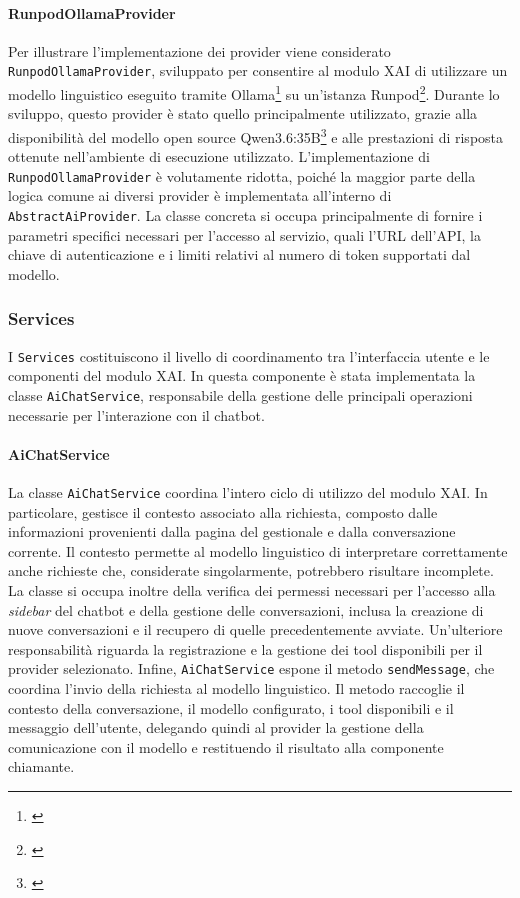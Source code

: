 \paragraph{RunpodOllamaProvider}
Per illustrare l'implementazione dei provider viene considerato \newline\texttt{RunpodOllamaProvider}, sviluppato per consentire al modulo XAI di utilizzare un modello linguistico 
eseguito tramite Ollama\footnote{\cite{site:ollama}} su un'istanza Runpod\footnote{\cite{site:runpod}}. Durante lo sviluppo, questo provider è stato quello principalmente utilizzato, grazie alla disponibilità del modello open source 
Qwen3.6:35B\footnote{\cite{site:qwen}} e alle prestazioni di risposta ottenute nell'ambiente di esecuzione utilizzato.
\newline
L'implementazione di \texttt{RunpodOllamaProvider} è volutamente ridotta, poiché la maggior parte della logica comune ai diversi provider è implementata all'interno di 
\texttt{AbstractAiProvider}. La classe concreta si occupa principalmente di fornire i parametri specifici necessari per l'accesso al servizio, quali l'URL dell'API, la chiave 
di autenticazione e i limiti relativi al numero di token supportati dal modello.

\subsubsection{Services}
I \texttt{Services} costituiscono il livello di coordinamento tra l'interfaccia utente e le componenti del modulo XAI. In questa componente è stata implementata la classe 
\texttt{AiChatService}, responsabile della gestione delle principali operazioni necessarie per l'interazione con il chatbot.

\paragraph{AiChatService}
La classe \texttt{AiChatService} coordina l'intero ciclo di utilizzo del modulo XAI. In particolare, gestisce il contesto associato alla richiesta, composto dalle informazioni 
provenienti dalla pagina del gestionale e dalla conversazione corrente. Il contesto permette al modello linguistico di interpretare correttamente anche richieste che, considerate 
singolarmente, potrebbero risultare incomplete.
\newline
La classe si occupa inoltre della verifica dei permessi necessari per l'accesso alla \textit{sidebar} del chatbot e della gestione delle conversazioni, inclusa la creazione di 
nuove conversazioni e il recupero di quelle precedentemente avviate. Un'ulteriore responsabilità riguarda la registrazione e la gestione dei tool disponibili per il provider 
selezionato.
\newline
Infine, \texttt{AiChatService} espone il metodo \texttt{sendMessage}, che coordina l'invio della richiesta al modello linguistico. Il metodo raccoglie il contesto della 
conversazione, il modello configurato, i tool disponibili e il messaggio dell'utente, delegando quindi al provider la gestione della comunicazione con il modello e restituendo 
il risultato alla componente chiamante.


